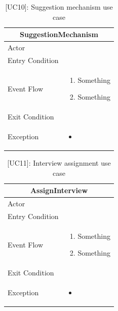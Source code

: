 \begin{table}[H]
    \centering
    \begin{tabular}{|p{3cm}|p{12cm}|}
    \hline
    \multicolumn{2}{|c|}{\textbf{SuggestionMechanism}} \\ \hline
    Actor & \\ \hline
    Entry Condition & \\ \hline
    Event Flow &      
    \begin{enumerate}         
        \item Something
        \item Something
    \end{enumerate} \\ \hline
    Exit Condition & \\ \hline
    Exception & 
    \begin{itemize}        
        \item     
    \end{itemize} \\ \hline
    \end{tabular}
    \caption{[UC10]: Suggestion mechanism use case}
    \label{tab:UC10}
\end{table}

\begin{table}[H]
    \centering
    \begin{tabular}{|p{3cm}|p{12cm}|}
    \hline
    \multicolumn{2}{|c|}{\textbf{AssignInterview}} \\ \hline
    Actor & \\ \hline
    Entry Condition & \\ \hline
    Event Flow &      
    \begin{enumerate}         
        \item Something
        \item Something
    \end{enumerate} \\ \hline
    Exit Condition & \\ \hline
    Exception & 
    \begin{itemize}         
        \item     
    \end{itemize} \\ \hline
    \end{tabular}
    \caption{[UC11]: Interview assignment use case}
    \label{tab:UC11}
\end{table}

